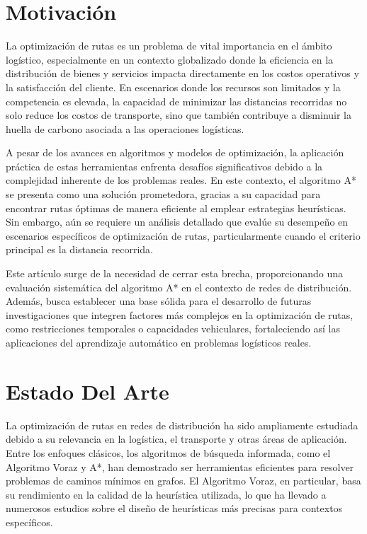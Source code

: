 \documentclass[conference]{IEEEtran}
\begin{document}
	\section{Motivación}
	
	La optimización de rutas es un problema de vital importancia en el ámbito logístico, especialmente en un contexto globalizado donde la eficiencia en la distribución de bienes y servicios impacta directamente en los costos operativos y la satisfacción del cliente. En escenarios donde los recursos son limitados y la competencia es elevada, la capacidad de minimizar las distancias recorridas no solo reduce los costos de transporte, sino que también contribuye a disminuir la huella de carbono asociada a las operaciones logísticas.
	
	A pesar de los avances en algoritmos y modelos de optimización, la aplicación práctica de estas herramientas enfrenta desafíos significativos debido a la complejidad inherente de los problemas reales. En este contexto, el algoritmo A* se presenta como una solución prometedora, gracias a su capacidad para encontrar rutas óptimas de manera eficiente al emplear estrategias heurísticas. Sin embargo, aún se requiere un análisis detallado que evalúe su desempeño en escenarios específicos de optimización de rutas, particularmente cuando el criterio principal es la distancia recorrida.
	
	Este artículo surge de la necesidad de cerrar esta brecha, proporcionando una evaluación sistemática del algoritmo A* en el contexto de redes de distribución. Además, busca establecer una base sólida para el desarrollo de futuras investigaciones que integren factores más complejos en la optimización de rutas, como restricciones temporales o capacidades vehiculares, fortaleciendo así las aplicaciones del aprendizaje automático en problemas logísticos reales.
	
	\section{Estado Del Arte}
	La optimización de rutas en redes de distribución ha sido ampliamente estudiada debido a su relevancia en la logística, el transporte y otras áreas de aplicación. Entre los enfoques clásicos, los algoritmos de búsqueda informada, como el Algoritmo Voraz y A*, han demostrado ser herramientas eficientes para resolver problemas de caminos mínimos en grafos. El Algoritmo Voraz, en particular, basa su rendimiento en la calidad de la heurística utilizada, lo que ha llevado a numerosos estudios sobre el diseño de heurísticas más precisas para contextos específicos.
		
\end{document}
